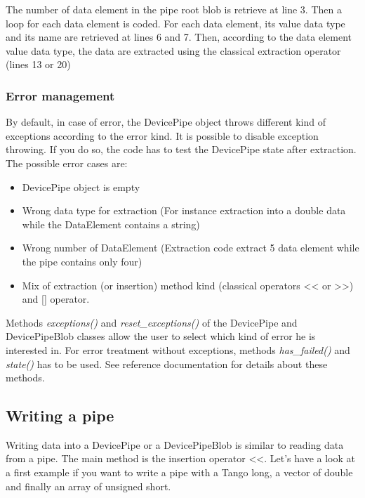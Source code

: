 The number of data element in the pipe root blob is retrieve at line
3. Then a loop for each data element is coded. For each data element,
its value data type and its name are retrieved at lines 6 and 7. Then,
according to the data element value data type, the data are extracted
using the classical extraction operator (lines 13 or 20)


\subsubsection{Error management}

By default, in case of error, the DevicePipe object throws different
kind of exceptions according to the error kind. It is possible to
disable exception throwing. If you do so, the code has to test the
DevicePipe state after extraction. The possible error cases are:
\begin{itemize}
\item DevicePipe object is empty
\item Wrong data type for extraction (For instance extraction into a double
data while the DataElement contains a string)
\item Wrong number of DataElement (Extraction code extract 5 data element
while the pipe contains only four)
\item Mix of extraction (or insertion) method kind (classical operators
<\textcompwordmark{}< or >\textcompwordmark{}>) and {[}{]} operator.
\end{itemize}
Methods \emph{exceptions()} and \emph{reset\_exceptions()} of the
DevicePipe and DevicePipeBlob classes allow the user to select which
kind of error he is interested in. For error treatment without exceptions,
methods \emph{has\_failed()} and \emph{state()} has to be used. See
reference documentation for details about these methods.


\subsection{Writing a pipe}

Writing data into a DevicePipe or a DevicePipeBlob is similar to reading
data from a pipe. The main method is the insertion operator \textquotedbl{}<\textcompwordmark{}<\textquotedbl{}.
Let's have a look at a first example if you want to write a pipe with
a Tango long, a vector of double and finally an array of unsigned
short.

